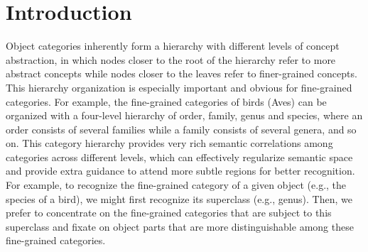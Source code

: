 \documentclass[sigconf]{acmart}
\begin{document}



\iffalse

\begin{CCSXML}
<ccs2012>
 <concept>
  <concept_id>10010520.10010553.10010562</concept_id>
  <concept_desc>Computer systems organization~Embedded systems</concept_desc>
  <concept_significance>500</concept_significance>
 </concept>
 <concept>
  <concept_id>10010520.10010575.10010755</concept_id>
  <concept_desc>Computer systems organization~Redundancy</concept_desc>
  <concept_significance>300</concept_significance>
 </concept>
 <concept>
  <concept_id>10010520.10010553.10010554</concept_id>
  <concept_desc>Computer systems organization~Robotics</concept_desc>
  <concept_significance>100</concept_significance>
 </concept>
 <concept>
  <concept_id>10003033.10003083.10003095</concept_id>
  <concept_desc>Networks~Network reliability</concept_desc>
  <concept_significance>100</concept_significance>
 </concept>
</ccs2012>  
\end{CCSXML}

\ccsdesc[500]{Computer systems organization~Embedded systems}
\ccsdesc[300]{Computer systems organization~Redundancy}
\ccsdesc{Computer systems organization~Robotics}
\ccsdesc[100]{Networks~Network reliability}
\fi



\maketitle

\section{Introduction}
Object categories inherently form a hierarchy with different levels of concept abstraction, in which nodes closer to the root of the hierarchy refer to more abstract concepts while nodes closer to the leaves refer to finer-grained concepts. This hierarchy organization is especially important and obvious for fine-grained categories. For example, the fine-grained categories of birds (Aves) can be organized with a four-level hierarchy of order, family, genus and species, where an order consists of several families while a family consists of several genera, and so on. This category hierarchy provides very rich semantic correlations among categories across different levels, which can effectively regularize semantic space and provide extra guidance to attend more subtle regions for better recognition. For example, to recognize the fine-grained category of a given object (e.g., the species of a bird), we might first recognize its superclass (e.g., genus). Then, we prefer to concentrate on the fine-grained categories that are subject to this superclass and fixate on object parts that are more distinguishable among these fine-grained categories.
\end{document}

